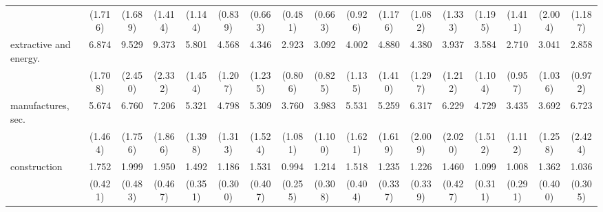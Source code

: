 {\begin{tabular}{l*{16}{c}}
                    &     (1.716)         &     (1.689)         &     (1.414)         &     (1.144)         &     (0.839)         &     (0.663)         &     (0.481)         &     (0.663)         &     (0.926)         &     (1.176)         &     (1.082)         &     (1.333)         &     (1.195)         &     (1.411)         &     (2.004)         &     (1.187)         \\
[1em]
extractive and energy.&       6.874\sym{***}&       9.529\sym{***}&       9.373\sym{***}&       5.801\sym{***}&       4.568\sym{***}&       4.346\sym{***}&       2.923\sym{***}&       3.092\sym{***}&       4.002\sym{***}&       4.880\sym{***}&       4.380\sym{***}&       3.937\sym{***}&       3.584\sym{***}&       2.710\sym{**} &       3.041\sym{**} &       2.858\sym{**} \\
                    &     (1.708)         &     (2.450)         &     (2.332)         &     (1.454)         &     (1.207)         &     (1.235)         &     (0.806)         &     (0.825)         &     (1.135)         &     (1.410)         &     (1.297)         &     (1.212)         &     (1.104)         &     (0.957)         &     (1.036)         &     (0.972)         \\
[1em]
manufactures, sec.  &       5.674\sym{***}&       6.760\sym{***}&       7.206\sym{***}&       5.321\sym{***}&       4.798\sym{***}&       5.309\sym{***}&       3.760\sym{***}&       3.983\sym{***}&       5.531\sym{***}&       5.259\sym{***}&       6.317\sym{***}&       6.229\sym{***}&       4.729\sym{***}&       3.435\sym{***}&       3.692\sym{***}&       6.723\sym{***}\\
                    &     (1.464)         &     (1.756)         &     (1.866)         &     (1.398)         &     (1.313)         &     (1.524)         &     (1.081)         &     (1.100)         &     (1.621)         &     (1.619)         &     (2.009)         &     (2.020)         &     (1.512)         &     (1.112)         &     (1.258)         &     (2.424)         \\
[1em]
construction        &       1.752\sym{*}  &       1.999\sym{**} &       1.950\sym{**} &       1.492         &       1.186         &       1.531         &       0.994         &       1.214         &       1.518         &       1.235         &       1.226         &       1.460         &       1.099         &       1.008         &       1.362         &       1.036         \\
                    &     (0.421)         &     (0.483)         &     (0.467)         &     (0.351)         &     (0.300)         &     (0.407)         &     (0.255)         &     (0.308)         &     (0.404)         &     (0.337)         &     (0.339)         &     (0.427)         &     (0.311)         &     (0.291)         &     (0.400)         &     (0.305)         \\

\end{tabular}}
